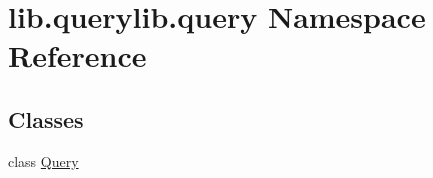 \hypertarget{namespacelib_1_1querylib_1_1query}{\section{lib.\-querylib.\-query Namespace Reference}
\label{namespacelib_1_1querylib_1_1query}
}
\subsection*{Classes}
\begin{DoxyCompactItemize}
\item 
class \hyperlink{classlib_1_1querylib_1_1query_1_1_query}{Query}
\end{DoxyCompactItemize}

